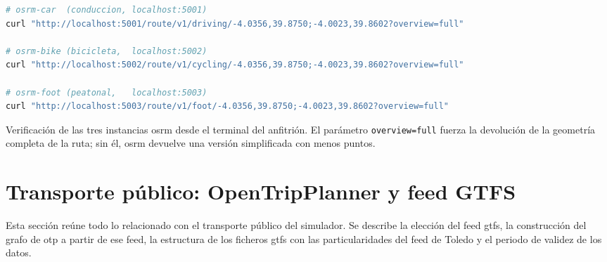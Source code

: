 \begin{code}[H]
\begin{lstlisting}[language=bash]
# osrm-car  (conduccion, localhost:5001)
curl "http://localhost:5001/route/v1/driving/-4.0356,39.8750;-4.0023,39.8602?overview=full"

# osrm-bike (bicicleta,  localhost:5002)
curl "http://localhost:5002/route/v1/cycling/-4.0356,39.8750;-4.0023,39.8602?overview=full"

# osrm-foot (peatonal,   localhost:5003)
curl "http://localhost:5003/route/v1/foot/-4.0356,39.8750;-4.0023,39.8602?overview=full"
\end{lstlisting}
\caption[Verificación de las tres instancias OSRM]{Verificación de las tres instancias \gls{osrm} desde el terminal del anfitrión. El parámetro \texttt{overview=full} fuerza la devolución de la geometría completa de la ruta; sin él, \gls{osrm} devuelve una versión simplificada con menos puntos.}
\label{cod:osrm_verificacion}
\end{code}


\section{Transporte público: OpenTripPlanner y feed GTFS}
\label{sec:impl_otp}

Esta sección reúne todo lo relacionado con el transporte público del simulador. Se describe la elección del feed \gls{gtfs}, la construcción del grafo de \gls{otp} a partir de ese feed, la estructura de los ficheros \gls{gtfs} con las particularidades del feed de Toledo y el periodo de validez de los datos.
\newpage
